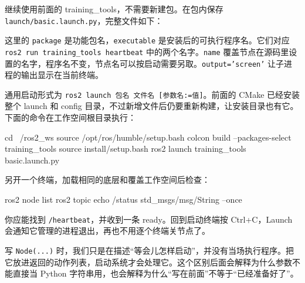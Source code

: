 \begin{example}
继续使用前面的 training\_tools，不需要新建包。在包内保存 \nolinkurl{launch/basic.launch.py}，完整文件如下：
\par\medskip\noindent\begin{minipage}{\linewidth}

\end{minipage}\par\smallskip
这里的 \texttt{package} 是功能包名，\texttt{executable} 是安装后的可执行程序名。它们对应 \texttt{ros2 run training\_tools heartbeat} 中的两个名字。\texttt{name} 覆盖节点在源码里设置的名字，程序名不变，节点名可以按启动需要另取。\texttt{output='screen'} 让子进程的输出显示在当前终端。

通用启动形式为 \texttt{ros2 launch 包名 文件名 [参数名:=值]}。前面的 CMake 已经安装整个 launch 和 config 目录，不过新增文件后仍要重新构建，让安装目录也有它。下面的命令在工作空间根目录执行：
\par\medskip\noindent\begin{minipage}{\linewidth}
\begin{tbash}
cd ~/ros2_ws
source /opt/ros/humble/setup.bash
colcon build --packages-select training_tools
source install/setup.bash
ros2 launch training_tools basic.launch.py
\end{tbash}
\end{minipage}\par\smallskip
另开一个终端，加载相同的底层和覆盖工作空间后检查：
\par\medskip\noindent\begin{minipage}{\linewidth}
\begin{tbash}
ros2 node list
ros2 topic echo /status std_msgs/msg/String --once
\end{tbash}
\end{minipage}\par\smallskip
你应能找到 \texttt{/heartbeat}，并收到一条 ready。回到启动终端按 Ctrl+C，Launch 会通知它管理的进程退出，再也不用逐个终端关节点了。
\end{example}

写 \texttt{Node(...)} 时，我们只是在描述“等会儿怎样启动”，并没有当场执行程序。把它放进返回的动作列表，启动系统才会处理它。这个区别后面会解释为什么参数不能直接当 Python 字符串用，也会解释为什么“写在前面”不等于“已经准备好了”。

